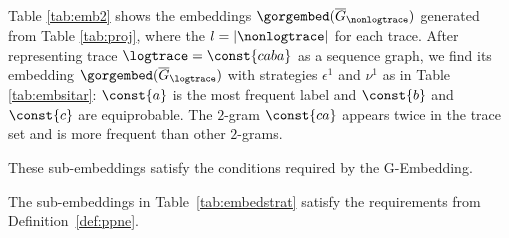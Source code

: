 \begin{example} 
	Table \ref{tab:emb2} shows the embeddings $\gorgembed(\overline{G}_\nonlogtrace)$ generated from Table \ref{tab:proj}, where the $l=|\nonlogtrace|$ for each \unravelled trace.
	After representing trace $\logtrace=\const{caba}$ as a sequence graph, we find its
	embedding $\gorgembed(\overline{G}_{\logtrace})$ with strategies $\epsilon^1$ and $\nu^1$ 
	{as} in Table \ref{tab:embsitar}: $\const{a}$ is the most frequent label and $\const{b}$ and $\const{c}$ are equiprobable. 
	The $2$-gram $\const{ca}$ appears twice in the trace set and is more frequent than other $2$-grams.
\end{example}
%
These sub-embeddings satisfy the conditions required by the G-Embedding.
\begin{lemma}
	\label{lem:addedForOurPropos}
	The sub-embeddings in Table~\ref{tab:embedstrat} satisfy the requirements from Definition~\ref{def:ppne}.
\end{lemma}


